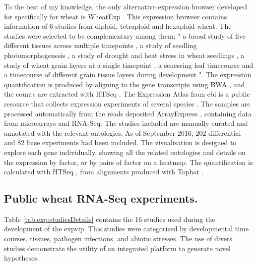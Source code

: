 To the best of my knowledge, the only alternative expression browser developed for specifically for wheat is WheatExp \citep{Pearce2015b}. 
This expression browser contains information of 6 studies from diploid, tetraploid and hexaploid wheat. 
The studies were selected to be complementary among them; " a broad study of five different tissues across multiple timepoints \citep{Choulet2014}, a study of seedling photomorphogenesis \citep{Fox2014}, a study of drought and heat stress in wheat seedlings \citep{Liu2015}, a study of wheat grain layers at a single timepoint \citep{Pearce2015}, a senescing leaf timecourse \citep{Pearce2014} and a timecourse of different grain tissue layers during development \citep{Pfeifer2014}".
The expression quantification is produced by aligning to the gene transcripts using BWA \citep{Li2010}, and the counts are extracted with HTSeq \citep{Anders2015}. 
The Expression Atlas from \acrshort{ebi} is a public resource that collects expression experiments of several species \citep{Petryszak2016}. 
The samples are processed automatically from the reads deposited ArrayExpress \citep{Kolesnikov2015}, containing data from microarrays and RNA-Seq.
The studies included are manually curated and annotated with the relevant ontologies. 
As of September 2016, 202 differential and 82 base experiments had been included. 
The visualisation is designed to explore each gene individually, showing all the related ontologies and details on the expression by factor, or by pairs of factor on a heatmap. 
The quantification is calculated with HTSeq \citep{Anders2015}, from alignments produced with Tophat \citep{Ling2013}.



\subsection{Public wheat RNA-Seq experiments.}

Table \ref{tab:exp:studiesDetails} contains the 16 studies used during the development of the \gls{expvip}. 
This studies were categorized by developmental time courses, tissues, pathogen infections, and abiotic stresses. 
The use of divers studies demonstrate the utility of an integrated platform to generate novel hypotheses. 



